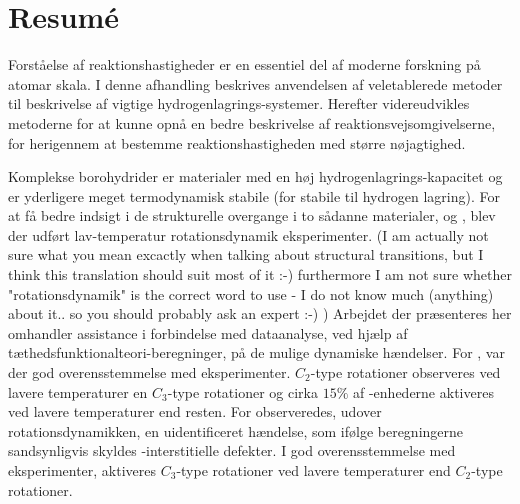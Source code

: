  

\chapter*{Resum\'e}

Forståelse af reaktionshastigheder er en essentiel del af moderne forskning på atomar skala.
I denne afhandling beskrives anvendelsen af veletablerede metoder til beskrivelse af vigtige hydrogenlagrings-systemer. Herefter videreudvikles metoderne for at kunne opnå en bedre beskrivelse af reaktionsvejsomgivelserne, for herigennem at bestemme reaktionshastigheden med større nøjagtighed.

Komplekse borohydrider er materialer med en høj hydrogenlagrings-kapacitet og er yderligere meget termodynamisk stabile (for stabile til hydrogen lagring).
For at få bedre indsigt i de strukturelle overgange i to sådanne materialer,  og , blev der udført lav-temperatur rotationsdynamik eksperimenter.
(I am actually not sure what you mean excactly when talking about structural transitions, but I think this translation should suit most of it :-) furthermore I am not sure whether "rotationsdynamik" is the correct word to use - I do not know much (anything) about it.. so you should probably ask an expert :-) )
Arbejdet der præsenteres her omhandler assistance i forbindelse med dataanalyse, ved hjælp af tæthedsfunktionalteori-beregninger, på de mulige dynamiske hændelser.
For , var der god overensstemmelse med eksperimenter. $C_2$-type rotationer observeres ved lavere temperaturer en $C_3$-type rotationer og cirka $15\%$ af -enhederne aktiveres ved lavere temperaturer end resten.
For  observeredes, udover rotationsdynamikken, en uidentificeret hændelse, som ifølge beregningerne sandsynligvis skyldes -interstitielle defekter.
I god overensstemmelse med eksperimenter, aktiveres $C_3$-type rotationer ved lavere temperaturer end $C_2$-type rotationer.


